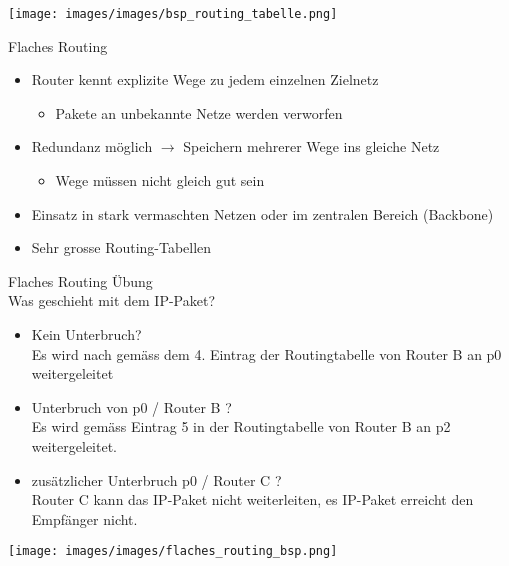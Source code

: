 \begin{example}
    \begin{center}
    \texttt{[image: images/images/bsp\_routing\_tabelle.png]}
    \end{center}
\end{example}

\begin{concept}{Flaches Routing}
    \begin{itemize}
        \item Router kennt explizite Wege zu jedem einzelnen Zielnetz
        \begin{itemize}
            \item Pakete an unbekannte Netze werden verworfen
        \end{itemize}
        \item Redundanz möglich $\rightarrow$ Speichern mehrerer Wege ins gleiche Netz
        \begin{itemize}
            \item Wege müssen nicht gleich gut sein
        \end{itemize}
        \item Einsatz in stark vermaschten Netzen oder im zentralen Bereich (Backbone)
        \item Sehr grosse Routing-Tabellen
    \end{itemize}
\end{concept}

\begin{example2}{Flaches Routing Übung}\\
Was geschieht mit dem IP-Paket?
    \begin{itemize}
        \item Kein Unterbruch?\\ Es wird nach gemäss dem 4. Eintrag der Routingtabelle von Router B an p0 weitergeleitet
        \item Unterbruch von p0 / Router B ? \\ Es wird gemäss Eintrag 5 in der Routingtabelle von Router B an p2 weitergeleitet.
        \item zusätzlicher Unterbruch p0 / Router C ?\\ Router C kann das IP-Paket nicht weiterleiten, es IP-Paket erreicht den Empfänger nicht.
    \end{itemize}
        \texttt{[image: images/images/flaches\_routing\_bsp.png]}
\end{example2}

